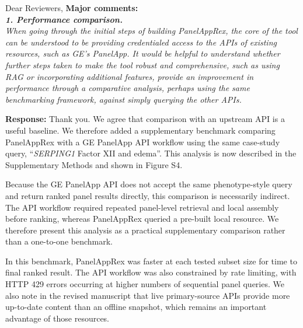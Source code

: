 \documentclass[12pt,a4paper]{letter}
\begin{document}
\begin{letter}{Dear Reviewers,}
\textbf{Major comments:}\\
\textit{\textbf{1. Performance comparison.}\\
When going through the initial steps of building PanelAppRex, the core of the tool can be understood to be providing credentialed access to the APIs of existing resources, such as GE’s PanelApp. It would be helpful to understand whether further steps taken to make the tool robust and comprehensive, such as using RAG or incorporating additional features, provide an improvement in performance through a comparative analysis, perhaps using the same benchmarking framework, against simply querying the other APIs.}

\textbf{Response:} Thank you. We agree that comparison with an upstream API is a useful baseline. We therefore added a supplementary benchmark comparing PanelAppRex with a GE PanelApp API workflow using the same case-study query, ``\textit{SERPING1} Factor XII and edema''. This analysis is now described in the Supplementary Methods and shown in Figure S4.

Because the GE PanelApp API does not accept the same phenotype-style query and return ranked panel results directly, this comparison is necessarily indirect. The API workflow required repeated panel-level retrieval and local assembly before ranking, whereas PanelAppRex queried a pre-built local resource. We therefore present this analysis as a practical supplementary comparison rather than a one-to-one benchmark.

In this benchmark, PanelAppRex was faster at each tested subset size for time to final ranked result. The API workflow was also constrained by rate limiting, with HTTP 429 errors occurring at higher numbers of sequential panel queries. We also note in the revised manuscript that live primary-source APIs provide more up-to-date content than an offline snapshot, which remains an important advantage of those resources.


\end{letter}
\end{document}
